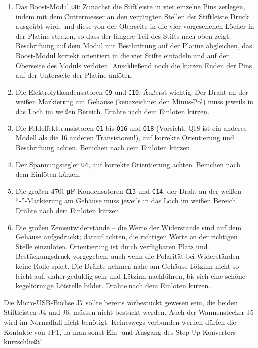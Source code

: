 \documentclass[paper=a4, open=any, numbers=noenddot]{scrbook}
\begin{document}
\begin{enumerate}
					\item Das Boost-Modul \texttt{U8}: Zunächst die Stiftleiste in vier einzelne Pins zerlegen, indem mit dem Cuttermesser an den verjüngten Stellen der Stiftleiste Druck ausgeübt wird, und diese von der Oberseite in die vier vorgesehenen Löcher in der Platine stecken, so dass der längere Teil des Stifts nach oben zeigt. Beschriftung auf dem Modul mit Beschriftung auf der Platine abgleichen, das Boost-Modul korrekt orientiert in die vier Stifte einfädeln und auf der Oberseite des Moduls verlöten. Anschließend noch die kurzen Enden der Pins auf der Unterseite der Platine anlöten.
					\item Die Elektrolytkondensatoren \texttt{C9} und \texttt{C10}. Äußerst wichtig: Der Draht an der weißen Markierung am Gehäuse (kennzeichnet den Minus-Pol) muss jeweils in das Loch im weißen Bereich. Drähte nach dem Einlöten kürzen.
					\item Die Feldeffekttransistoren \texttt{Q1} bis \texttt{Q16} und \texttt{Q18} (Vorsicht, Q18 ist ein anderes Modell als die 16 anderen Transistoren!), auf korrekte Orientierung und Beschriftung achten. Beinchen nach dem Einlöten kürzen.
					\item Der Spannungsregler \texttt{U4}, auf korrekte Orientierung achten. Beinchen nach dem Einlöten kürzen.
					\item Die großen 4700-\si{\micro\farad}-Kondensatoren \texttt{C13} und \texttt{C14}, der Draht an der weißen \enquote{-}-Markierung am Gehäuse muss jeweils in das Loch im weißen Bereich. Drähte nach dem Einlöten kürzen.
					\item Die großen Zementwiderstände -- die Werte der Widerstände sind auf dem Gehäuse aufgedruckt; darauf achten, die richtigen Werte an der richtigen Stelle einzulöten. Orientierung ist durch verfügbaren Platz und Bestückungsdruck vorgegeben, auch wenn die Polarität bei Widerständen keine Rolle spielt. Die Drähte nehmen nahe am Gehäuse Lötzinn nicht so leicht auf, daher geduldig sein und Lötzinn nachführen, bis sich eine schöne kegelförmige Lötstelle bildet. Drähte nach dem Einlöten kürzen.
				\end{enumerate}

				Die Micro-USB-Buchse J7 sollte bereits vorbestückt gewesen sein, die beiden Stiftleisten J4 und J6, müssen nicht bestückt werden. Auch der Wannenstecker J5 wird im Normalfall nicht benötigt. Keineswegs verbunden werden dürfen die Kontakte von JP1, da man sonst Ein- und Ausgang des Step-Up-Konverters kurzschließt!
\end{document}
